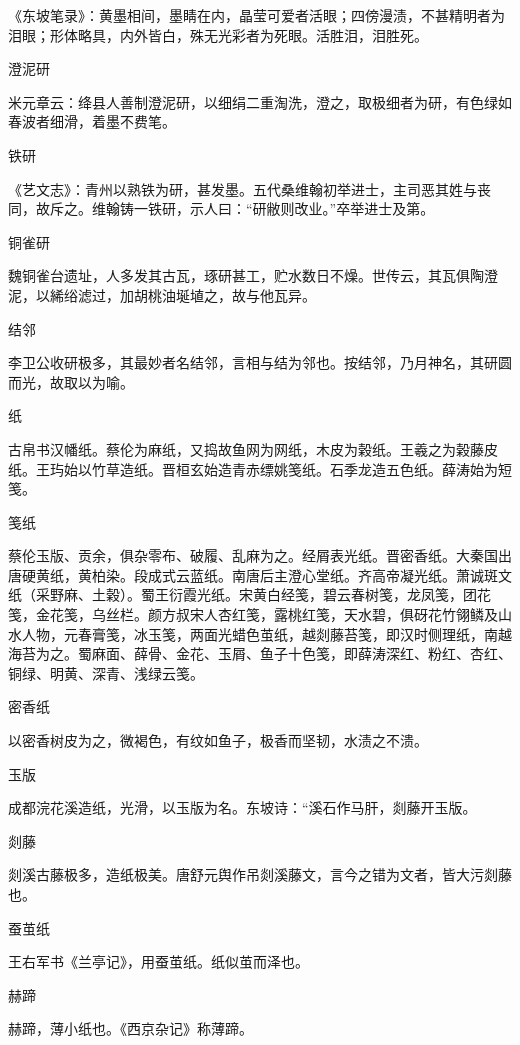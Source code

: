 \documentclass[a4paper,12pt,UTF8,twoside]{ctexbook}
\begin{document}
    《东坡笔录》：黄墨相间，墨睛在内，晶莹可爱者活眼；四傍漫渍，不甚精明者为泪眼；形体略具，内外皆白，殊无光彩者为死眼。活胜泪，泪胜死。
    
    澄泥研
    
    米元章云：绛县人善制澄泥研，以细绢二重淘洗，澄之，取极细者为研，有色绿如春波者细滑，着墨不费笔。
    
    铁研
    
    《艺文志》：青州以熟铁为研，甚发墨。五代桑维翰初举进士，主司恶其姓与丧同，故斥之。维翰铸一铁研，示人曰：“研敝则改业。”卒举进士及第。
    
    铜雀研
    
    魏铜雀台遗址，人多发其古瓦，琢研甚工，贮水数日不燥。世传云，其瓦俱陶澄泥，以絺绤滤过，加胡桃油埏埴之，故与他瓦异。
    
    结邻
    
    李卫公收研极多，其最妙者名结邻，言相与结为邻也。按结邻，乃月神名，其研圆而光，故取以为喻。
    
    纸
    
    古帛书汉幡纸。蔡伦为麻纸，又捣故鱼网为网纸，木皮为榖纸。王羲之为榖藤皮纸。王玙始以竹草造纸。晋桓玄始造青赤缥姚笺纸。石季龙造五色纸。薛涛始为短笺。
    
    笺纸
    
    蔡伦玉版、贡余，俱杂零布、破履、乱麻为之。经屑表光纸。晋密香纸。大秦国出唐硬黄纸，黄柏染。段成式云蓝纸。南唐后主澄心堂纸。齐高帝凝光纸。萧诚斑文纸（采野麻、土榖）。蜀王衍霞光纸。宋黄白经笺，碧云春树笺，龙凤笺，团花笺，金花笺，乌丝栏。颜方叔宋人杏红笺，露桃红笺，天水碧，俱砑花竹翎鳞及山水人物，元春膏笺，冰玉笺，两面光蜡色茧纸，越剡藤苔笺，即汉时侧理纸，南越海苔为之。蜀麻面、薛骨、金花、玉屑、鱼子十色笺，即薛涛深红、粉红、杏红、铜绿、明黄、深青、浅绿云笺。
    
    密香纸
    
    以密香树皮为之，微褐色，有纹如鱼子，极香而坚韧，水渍之不溃。
    
    玉版
    
    成都浣花溪造纸，光滑，以玉版为名。东坡诗：“溪石作马肝，剡藤开玉版。
    
    剡藤
    
    剡溪古藤极多，造纸极美。唐舒元舆作吊剡溪藤文，言今之错为文者，皆大污剡藤也。
    
    蚕茧纸
    
    王右军书《兰亭记》，用蚕茧纸。纸似茧而泽也。
    
    赫蹄
    
    赫蹄，薄小纸也。《西京杂记》称薄蹄。
    
\end{document}

